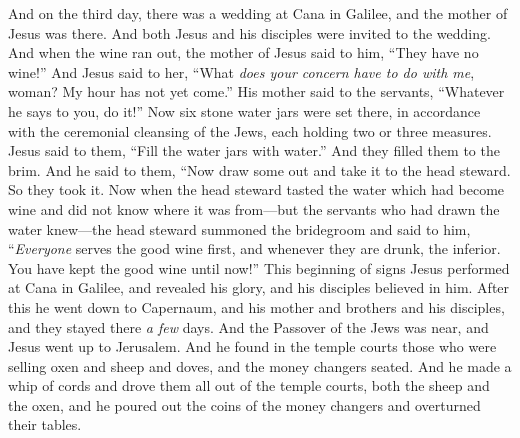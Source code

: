 \begin{biblechapter} %
 And on the third day, there was a wedding at Cana in Galilee, and the mother of Jesus was there.
\verse And both Jesus and his disciples were invited to the wedding.
\verse And when the wine ran out, the mother of Jesus said to him, “They have no wine!”
\verse And Jesus said to her, “What \textit{does your concern have to do with me}, woman? My hour has not yet come.”
\verse His mother said to the servants, “Whatever he says to you, do it!”
\verse Now six stone water jars were set there, in accordance with the ceremonial cleansing of the Jews, each holding two or three measures.
\verse Jesus said to them, “Fill the water jars with water.” And they filled them to the brim.
\verse And he said to them, “Now draw some out and take it to the head steward. So they took it.
\verse Now when the head steward tasted the water which had become wine and did not know where it was from—but the servants who had drawn the water knew—the head steward summoned the bridegroom
\verse and said to him, “\textit{Everyone} serves the good wine first, and whenever they are drunk, the inferior. You have kept the good wine until now!”
\verse This beginning of signs Jesus performed at Cana in Galilee, and revealed his glory, and his disciples believed in him.
 After this he went down to Capernaum, and his mother and brothers and his disciples, and they stayed there \textit{a few} days.
\verse And the Passover of the Jews was near, and Jesus went up to Jerusalem.
 And he found in the temple courts those who were selling oxen and sheep and doves, and the money changers seated.
\verse And he made a whip of cords and drove them all out of the temple courts, both the sheep and the oxen, and he poured out the coins of the money changers and overturned their tables.

\end{biblechapter}

